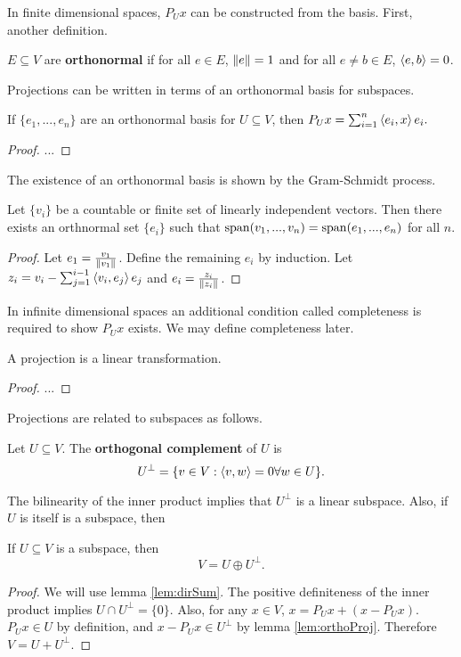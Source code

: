 In finite dimensional spaces, $P_U x$ can be constructed from the
basis. First, another definition.
\begin{definition}
  $E \subseteq V$ are \textbf{orthonormal} if for all $e \in E$,
  $\left\Vert {e} \right\Vert = 1$ and for all $e \neq b \in E$, $\left\langle {e} , {b} \right\rangle = 0$.
\end{definition}
Projections can be written in terms of an orthonormal basis for
subspaces. 
\begin{lemma}
  If $\{e_1, ..., e_n\}$ are an orthonormal basis for $U \subseteq V$,
  then $P_U x = \sum_{i=1}^n \left\langle {e_i} , {x} \right\rangle e_i.$
\end{lemma}
\begin{proof}
  ...
\end{proof}
The existence of an orthonormal basis is shown by the Gram-Schmidt process.
\begin{theorem}
  Let $\{v_i\}$ be a countable or finite set of linearly independent
  vectors. Then there exists an orthnormal set $\{e_i\}$ such that
  $\mathrm{span}(v_1, ... , v_n) = \mathrm{span}(e_1, ..., e_n)$ for all $n$.
\end{theorem}
\begin{proof}
  Let $e_1 = \frac{v_1}{\left\Vert {v_1} \right\Vert}$. Define the remaining $e_i$ by
  induction.
  Let $z_i = v_i - \sum_{j=1}^{i-1} \left\langle {v_i} , {e_j} \right\rangle e_j$
  and $e_i = \frac{z_i}{\left\Vert {z_i} \right\Vert}$.
\end{proof}
In infinite dimensional spaces an additional condition called
completeness is required to show $P_U x$ exists. We may define
completeness later.
\begin{lemma} 
  A projection is a linear transformation. 
\end{lemma}
\begin{proof}
  ...
\end{proof}

Projections are related to subspaces as follows.
\begin{definition}
  Let $U \subseteq V$. The \textbf{orthogonal complement} of $U$ is
  \[ U^\perp = \{v \in V: \left\langle {v} , {w} \right\rangle = 0 \forall w \in U \}. \]
\end{definition}
The bilinearity of the inner product implies that $U^\perp$ is a
linear subspace. Also, if $U$ is itself is a subspace, then
\begin{lemma}
  If $U \subseteq V$ is a subspace,  then 
  \[ V = U \oplus U^\perp. \]
\end{lemma}
\begin{proof}
  We will use lemma \ref{lem:dirSum}. The positive definiteness of the
  inner product implies $U \cap U^\perp = \{0\}$. Also, for any $x \in
  V$, $x = P_U x + (x - P_U x)$. $P_U x \in U$ by definition, and $x -
  P_U x \in U^\perp$ by lemma \ref{lem:orthoProj}. Therefore $V = U +
  U^\perp.$ 
\end{proof}

